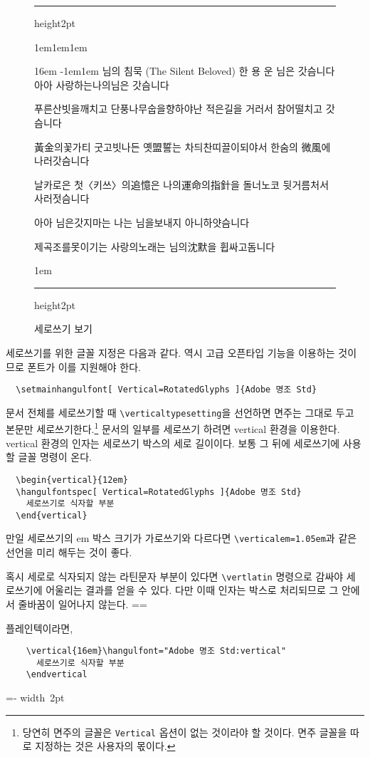 \documentclass[a4paper]{article}
\def\grayhrule{{\color{white!80!black}\hrule height2pt}}
\def\grayvrule{{\color{white!80!black}\vrule width 2pt}}
\newenvironment{plaintex}
  {\setbox0=\vbox\bgroup\hsize=\dimexpr\textwidth-12pt\relax\medskip\par\small}
  {\par\medskip\egroup \par\medskip\par
    \dimen0=\dimexpr\pagegoal-\pagetotal\relax
    \ifdim\ht0<\dimen0
      \hbox{\grayvrule\kern10pt\box0}%
    \else
      \setbox2=\vsplit0 to\dimen0
      \lineskip=0pt
      \ifvoid2 \else\hbox{\grayvrule\kern10pt\box2}\fi
      \ifvoid0 \else\hbox{\grayvrule\kern10pt\box0}\fi
    \fi \par\medskip\par }
\newenvironment{example}
  {\hbox\bgroup\grayvrule
    \vbox\bgroup\hsize\dimexpr\textwidth-4pt\relax
    \grayhrule\kern1em\leftskip1em\rightskip1em
  }{\par\kern1em\grayhrule\egroup\grayvrule\egroup}
\def\cs#1{\texttt{\textbackslash #1}}
\begin{document}
\begin{figure}
\begin{example}
\hfil\begin{vertical}{16em}
  \hangulmarks \hanjabyhangulfont \parindent-1em\leftskip1em
  \disablecjksymbolspacing
\noindent 님의 침묵 {\small(The Silent Beloved)}
\smallbreak
\hfil\hfil 한 용 운\hfil
\bigbreak
님은 갓슴니다 아아 사랑하는나의님은 갓슴니다\par
푸른산빗을깨치고 단풍나무숩을향하야난 적은길을 거러서 참어떨치고 갓슴니다\par
黃金의꽃가티 굿고빗나든 옛盟誓는 차듸찬띠끌이되야서 한숨의 微風에 나러갓슴니다\par
날카로은 첫〈키쓰〉의追憶은 나의運命의指針을 돌너노코 뒷거름처서 사러젓슴니다\par
\hellipsis\par
아아 님은갓지마는 나는 님을보내지 아니하얏슴니다\par
제곡조를못이기는 사랑의노래는 님의沈默을 휩싸고돔니다\par
\end{vertical}\hfil
\end{example}
\caption{세로쓰기 보기}\label{fig:vertical}
\end{figure}

세로쓰기를 위한 글꼴 지정은 다음과 같다.
역시 고급 오픈타입 기능을 이용하는 것이므로
폰트가 이를 지원해야 한다.
\begin{verbatim}
  \setmainhangulfont[ Vertical=RotatedGlyphs ]{Adobe 명조 Std}
\end{verbatim}
문서 전체를 세로쓰기할 때 \cs{verticaltypesetting}을 선언하면
면주는 그대로 두고 본문만 세로쓰기한다.\footnote{당연히 면주의 글꼴은
\texttt{Vertical} 옵션이 없는 것이라야 할 것이다.
면주 글꼴을 따로 지정하는 것은 사용자의 몫이다. }
문서의 일부를 세로쓰기 하려면 vertical 환경을 이용한다.
vertical 환경의 인자는 세로쓰기 박스의 세로 길이이다.
보통 그 뒤에  세로쓰기에 사용할 글꼴 명령이 온다.
\begin{verbatim}
  \begin{vertical}{12em}
  \hangulfontspec[ Vertical=RotatedGlyphs ]{Adobe 명조 Std}
    세로쓰기로 식자할 부분
  \end{vertical}
\end{verbatim}
만일 세로쓰기의 em 박스 크기가 가로쓰기와 다르다면
\cs{verticalem=1.05em}과 같은 선언을 미리 해두는 것이 좋다.

혹시 세로로 식자되지 않는 라틴문자 부분이 있다면
\cs{vertlatin} 명령으로 감싸야 세로쓰기에 어울리는
결과를 얻을 수 있다. 다만 이때 인자는 박스로 처리되므로
그 안에서 줄바꿈이 일어나지 않는다.
\medbreak
\begin{plaintex}
플레인텍이라면,
\begin{verbatim}
    \vertical{16em}\hangulfont="Adobe 명조 Std:vertical"
      세로쓰기로 식자할 부분
    \endvertical
\end{verbatim}
\end{plaintex}
\end{document}

